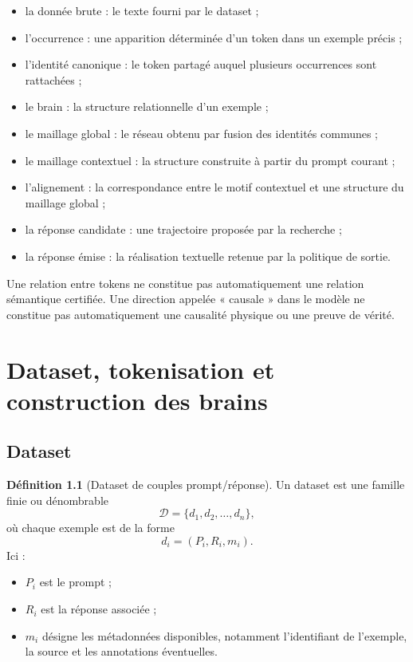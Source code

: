 \documentclass[11pt,a4paper]{report}
\theoremstyle{definition}
\newtheorem{definition}{Définition}[chapter]
\theoremstyle{plain}
\theoremstyle{remark}
\newcommand{\D}{\mathcal{D}}
\begin{document}
\begin{itemize}
  \item la donnée brute : le texte fourni par le dataset ;
  \item l'occurrence : une apparition déterminée d'un token dans
        un exemple précis ;
  \item l'identité canonique : le token partagé auquel plusieurs
        occurrences sont rattachées ;
  \item le brain : la structure relationnelle d'un exemple ;
  \item le maillage global : le réseau obtenu par fusion des
        identités communes ;
  \item le maillage contextuel : la structure construite à partir
        du prompt courant ;
  \item l'alignement : la correspondance entre le motif contextuel
        et une structure du maillage global ;
  \item la réponse candidate : une trajectoire proposée par la
        recherche ;
  \item la réponse émise : la réalisation textuelle retenue par
        la politique de sortie.
\end{itemize}

Une relation entre tokens ne constitue pas automatiquement une
relation sémantique certifiée. Une direction appelée
« causale » dans le modèle ne constitue pas automatiquement une
causalité physique ou une preuve de vérité.

\chapter{Dataset, tokenisation et construction des brains}

\section{Dataset}

\begin{definition}[Dataset de couples prompt/réponse]
Un dataset est une famille finie ou dénombrable
\[
\D=\{d_1,d_2,\ldots,d_n\},
\]
où chaque exemple est de la forme
\[
d_i=(P_i,R_i,m_i).
\]
Ici :
\begin{itemize}
  \item \(P_i\) est le prompt ;
  \item \(R_i\) est la réponse associée ;
  \item \(m_i\) désigne les métadonnées disponibles, notamment
        l'identifiant de l'exemple, la source et les annotations
        éventuelles.
\end{itemize}
\end{definition}
\end{document}
